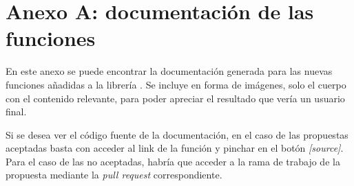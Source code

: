 \chapter{Anexo A: documentación de las funciones} \label{chp:anexo_docs_funcs}

En este anexo se puede encontrar la documentación generada para las nuevas funciones añadidas a la librería \pvlibpy. Se incluye en forma de imágenes, solo el cuerpo con el contenido relevante, para poder apreciar el resultado que vería un usuario final.

Si se desea ver el código fuente de la documentación, en el caso de las propuestas aceptadas basta con acceder al link de la función y pinchar en el botón \textit{[source]}. Para el caso de las no aceptadas, habría que acceder a la rama de trabajo de la propuesta mediante la \textit{pull request} correspondiente.


